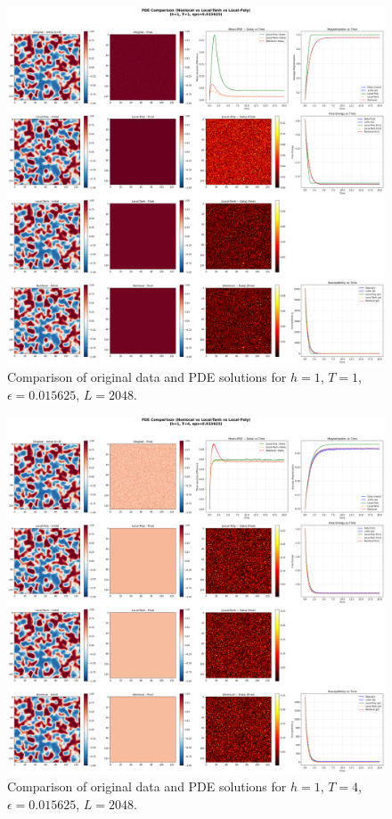 \documentclass[11pt,a4paper]{article}
\begin{document}
\begin{figure}[!h]
    \centering
    \includegraphics[width=1.0\textwidth]{fig/compare_pde_solvers_L2048_h1_T1_eps0.015625.png}
    \caption{Comparison of original data and PDE solutions for $h=1$, $T=1$, $\epsilon=0.015625$, $L=2048$.}
    \label{fig:pde_comparison_h1_T1_eps0.015625_L2048}
\end{figure}


\begin{figure}[!h]
    \centering
    \includegraphics[width=1.0\textwidth]{fig/compare_pde_solvers_L2048_h1_T4_eps0.015625.png}
    \caption{Comparison of original data and PDE solutions for $h=1$, $T=4$, $\epsilon=0.015625$, $L=2048$.}
    \label{fig:pde_comparison_h1_T4_eps0.015625_L2048}
\end{figure}
\end{document}
